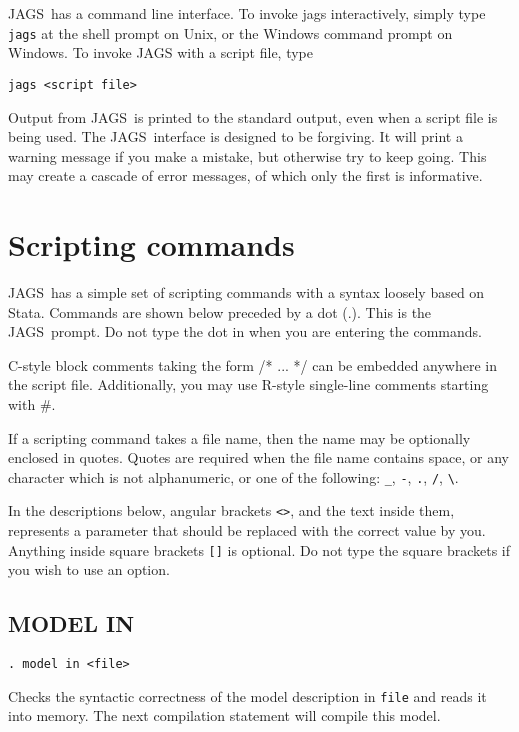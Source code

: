 \documentclass[11pt, a4paper, titlepage]{report}
\newcommand{\JAGS}{\textsf{JAGS}}
\newcommand{\R}{\textsf{R}}
\begin{document}
\JAGS\ has a command line interface. To invoke jags interactively,
simply type \texttt{jags} at the shell prompt on Unix, or the Windows
command prompt on Windows. To invoke JAGS with a script file, type
\begin{verbatim}
jags <script file>
\end{verbatim}
Output from \JAGS\ is printed to the standard output, even when a
script file is being used.  The \JAGS\ interface is designed to be
forgiving. It will print a warning message if you make a mistake, but
otherwise try to keep going.  This may create a cascade of error messages,
of which only the first is informative.

\section{Scripting commands}
\label{section:scripting}

\JAGS\ has a simple set of scripting commands with a syntax loosely
based on \textsf{Stata}. Commands are shown below preceded by a dot
(.). This is the \JAGS\ prompt. Do not type the dot in when you are
entering the commands.

C-style block comments taking the form /* ... */ can be
embedded anywhere in the script file.  Additionally, you may use
\R-style single-line comments starting with \#.

If a scripting command takes a file name, then the name may be
optionally enclosed in quotes. Quotes are required when the file name
contains space, or any character which is not alphanumeric, or one of
the following: \verb+_+, \verb+-+, \verb+.+, \verb+/+, \verb+\+.

In the descriptions below, angular brackets \verb+<>+, and the text
inside them, represents a parameter that should be replaced with the
correct value by you.  Anything inside square brackets \verb+[]+ is
optional. Do not type the square brackets if you wish to use an
option.

\subsection{MODEL IN}

\begin{verbatim}
. model in <file>
\end{verbatim}
Checks the syntactic correctness of the model description in
\texttt{file} and reads it into memory. The next compilation
statement will compile this model. 
\end{document}
